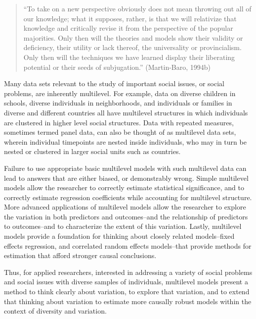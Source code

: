 \documentclass[
  letterpaper,
  DIV=11,
  numbers=noendperiod]{scrreprt}
\begin{document}
\begin{quote}
``To take on a new perspective obviously does not mean throwing out all
of our knowledge; what it supposes, rather, is that we will relativize
that knowledge and critically revise it from the perspective of the
popular majorities. Only then will the theories and models show their
validity or deficiency, their utility or lack thereof, the universality
or provincialism. Only then will the techniques we have learned display
their liberating potential or their seeds of subjugation.''
(Martin-Baro, 1994b)
\end{quote}

Many data sets relevant to the study of important social issues, or
social problems, are inherently multilevel. For example, data on diverse
children in schools, diverse individuals in neighborhoods, and
individuals or families in diverse and different countries all have
multilevel structures in which individuals are clustered in higher level
social structures. Data with repeated measures, sometimes termed panel
data, can also be thought of as multilevel data sets, wherein individual
timepoints are nested inside individuals, who may in turn be nested or
clustered in larger social units such as countries.

Failure to use appropriate basic multilevel models with such multilevel
data can lead to answers that are either biased, or demonstrably wrong.
Simple multilevel models allow the researcher to correctly estimate
statistical significance, and to correctly estimate regression
coefficients while accounting for multilevel structure. More advanced
applications of multilevel models allow the researcher to explore the
variation in both predictors and outcomes--and the relationship of
predictors to outcomes--and to characterize the extent of this
variation. Lastly, multilevel models provide a foundation for thinking
about closely related models--fixed effects regression, and correlated
random effects models--that provide methods for estimation that afford
stronger causal conclusions.

Thus, for applied researchers, interested in addressing a variety of
social problems and social issues with diverse samples of individuals,
multilevel models present a method to think clearly about variation, to
explore that variation, and to extend that thinking about variation to
estimate more causally robust models within the context of diversity and
variation.

\end{document}
